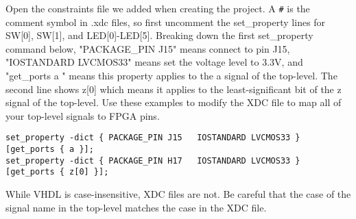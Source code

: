 Open the constraints file we added when creating the project.
A \verb|#| is the comment symbol in .xdc files, so first uncomment the set\_property lines
for SW[0], SW[1], and LED[0]-LED[5].
Breaking down the first set\_property command below, "PACKAGE\_PIN J15" means connect to pin
J15, "IOSTANDARD LVCMOS33" means set the voltage level to 3.3V, and "get\_ports { a }" means
this property applies to the a signal of the top-level.
The second line shows z[0] which means it applies to the least-significant bit of the z signal of
the top-level.
Use these examples to modify the XDC file to map all of your top-level signals to FPGA pins.

\begin{verbatim}
set_property -dict { PACKAGE_PIN J15   IOSTANDARD LVCMOS33 } [get_ports { a }];
set_property -dict { PACKAGE_PIN H17   IOSTANDARD LVCMOS33 } [get_ports { z[0] }];
\end{verbatim}

\begin{mdframed}[style=note]
    While VHDL is case-insensitive, XDC files are not.
    Be careful that the case of the signal name in the top-level matches the case in the XDC file.
\end{mdframed}
